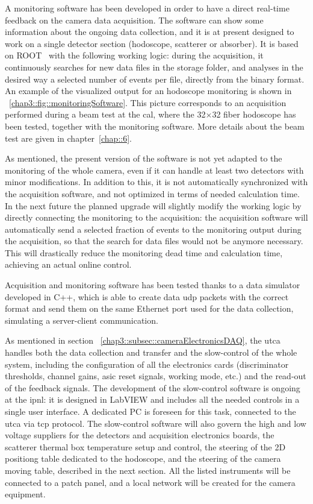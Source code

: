 A monitoring software has been developed in order to have a direct real-time feedback on the camera data acquisition. The software can show some information about the ongoing data collection, and it is at present designed to work on a single detector section (hodoscope, scatterer or absorber). It is based on ROOT~\parencite{Brun1997} with the following working logic: during the acquisition, it continuously searches for new data files in the storage folder, and analyses in the desired way a selected number of events per file, directly from the binary format. An example of the visualized output for an hodoscope monitoring is shown in \figurename~\ref{chap3::fig::monitoringSoftware}. This picture corresponds to an acquisition performed during a beam test at the \gls{cal}, where the 32$\times$32 fiber hodoscope has been tested, together with the monitoring software. More details about the beam test are given in chapter~\ref{chap::6}.

As mentioned, the present version of the software is not yet adapted to the monitoring of the whole camera, even if it can handle at least two detectors with minor modifications. In addition to this, it is not automatically synchronized with the acquisition software, and not optimized in terms of needed calculation time. In the next future the planned upgrade will slightly modify the working logic by directly connecting the monitoring to the acquisition: the acquisition software will automatically send a selected fraction of events to the monitoring output during the acquisition, so that the search for data files would not be anymore necessary. This will drastically reduce the monitoring dead time and calculation time, achieving an actual online control.

Acquisition and monitoring software has been tested thanks to a data simulator developed in C++, which is able to create data \gls{udp} packets with the correct format and send them on the same Ethernet port used for the data collection, simulating a server-client communication.


As mentioned in section~	\ref{chap3::subsec::cameraElectronicsDAQ}, the \gls{utca} handles both the data collection and transfer and the slow-control of the whole system, including the configuration of all the electronics cards (discriminator thresholds, channel gains, \gls{asic} reset signals, working mode, etc.) and the read-out of the feedback signals. The development of the slow-control software is ongoing at the \gls{ipnl}: it is designed in LabVIEW and includes all the needed controls in a single user interface. A dedicated PC is foreseen for this task, connected to the \gls{utca} via \gls{tcp} protocol. The slow-control software will also govern the high and low voltage suppliers for the detectors and acquisition electronics boards, the scatterer thermal box temperature setup and control, the steering of the 2D positiong table dedicated to the hodoscope, and the steering of the camera moving table, described in the next section. All the listed instruments will be connected to a patch panel, and a local network will be created for the camera equipment.      

